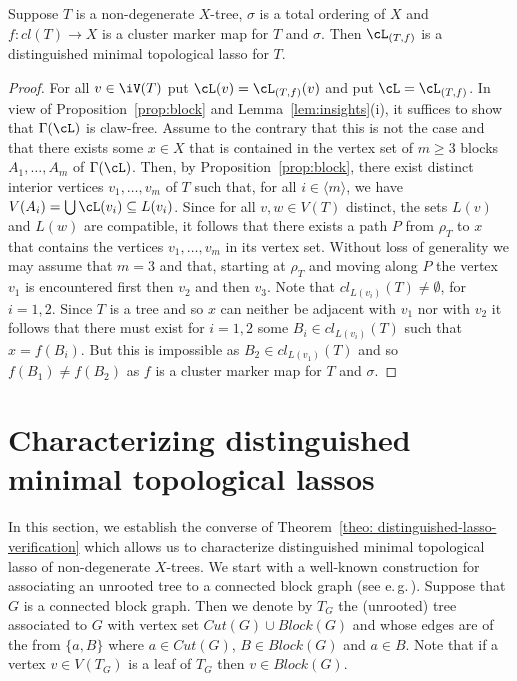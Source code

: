 \begin{thm}
  \label{theo: distinguished-lasso-verification}
  Suppose $T$ is a non-degenerate $X$-tree, $\sigma$ is a total ordering of
  $X$ and $f:cl(T)\to X$ is a cluster marker map for $T$ and $\sigma$. Then
  $\cL_{(T,f)}$ is a distinguished minimal topological lasso for $T$.
\end{thm}
\begin{proof}
  For all $v\in \iV(T)$ put $\cL(v) = \cL_{(T,f)}(v)$ and put
  $\cL=\cL_{(T,f)}$.  In view of Proposition~\ref{prop:block} and
  Lemma~\ref{lem:insights}(i), it suffices to show that $\Gamma(\cL)$ is
  claw-free.  Assume to the contrary that this is not the case and that there
  exists some $x\in X$ that is contained in the vertex set of $m\geq 3$ blocks
  $A_1,\ldots,A_m$ of $\Gamma(\cL)$. Then, by Proposition~\ref{prop:block},
  there exist distinct interior vertices $v_1, \ldots, v_m$ of $T$ such that,
  for all $i\in\langle m\rangle$, we have $V(A_i)=\bigcup\cL(v_i)\subseteq
  L(v_i)$.  Since for all $v,w\in V(T)$ distinct, the sets $L(v)$ and $L(w)$
  are compatible, it follows that there exists a path $P$ from $\rho_T$ to $x$
  that contains the vertices $v_1,\ldots, v_m$ in its vertex set. Without loss
  of generality we may assume that $m=3$ and that, starting at $\rho_T$ and
  moving along $P$ the vertex $v_1$ is encountered first then $v_2$ and then
  $v_3$. Note that $cl_{L(v_i)}(T)\not=\emptyset$, for $i=1,2$.  Since $T$ is
  a tree and so $x$ can neither be adjacent with $v_1$ nor with $v_2$ it
  follows that there must exist for $i=1,2$ some $B_i\in cl_{L(v_i)}(T)$ such
  that $x=f(B_i)$. But this is impossible as $B_2\in cl_{L(v_1)}(T)$ and so
  $f(B_1)\not=f(B_2)$ as $f$ is a cluster marker map for $T$ and $\sigma$.
\end{proof}
 

\section{Characterizing distinguished minimal topological lassos}
\label{sec:characterization-distinguished}

In this section, we establish the converse of Theorem~\ref{theo:
  distinguished-lasso-verification} which allows us to characterize
distinguished minimal topological lasso of non-degenerate $X$-trees.  We start
with a well-known construction for associating an unrooted tree to a connected
block graph (see e.\,g.\,\cite{diestel}).  Suppose that $G$ is a connected
block graph. Then we denote by $T_G$ the (unrooted) tree associated to $G$
with vertex set $Cut(G)\cup Block(G)$ and whose edges are of the from
$\{a,B\}$ where $a\in Cut(G)$, $B\in Block(G)$ and $a\in B$. Note that if a
vertex $v\in V(T_G)$ is a leaf of $T_G$ then $v\in Block(G)$.

